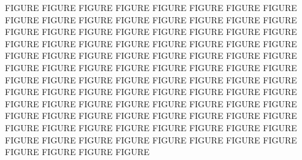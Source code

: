 \documentclass{standalone}
\begin{document}
FIGURE FIGURE FIGURE FIGURE FIGURE FIGURE FIGURE FIGURE FIGURE FIGURE FIGURE FIGURE FIGURE FIGURE FIGURE FIGURE FIGURE FIGURE FIGURE FIGURE FIGURE FIGURE FIGURE FIGURE FIGURE FIGURE FIGURE FIGURE FIGURE FIGURE FIGURE FIGURE FIGURE FIGURE FIGURE FIGURE FIGURE FIGURE FIGURE FIGURE FIGURE FIGURE FIGURE FIGURE FIGURE FIGURE FIGURE FIGURE FIGURE FIGURE FIGURE FIGURE FIGURE FIGURE FIGURE FIGURE FIGURE FIGURE FIGURE FIGURE FIGURE FIGURE FIGURE FIGURE FIGURE FIGURE FIGURE FIGURE FIGURE FIGURE FIGURE FIGURE FIGURE FIGURE FIGURE FIGURE FIGURE FIGURE FIGURE FIGURE FIGURE FIGURE FIGURE FIGURE FIGURE FIGURE FIGURE FIGURE FIGURE FIGURE FIGURE FIGURE FIGURE FIGURE FIGURE FIGURE FIGURE FIGURE FIGURE FIGURE 
\end{document}
